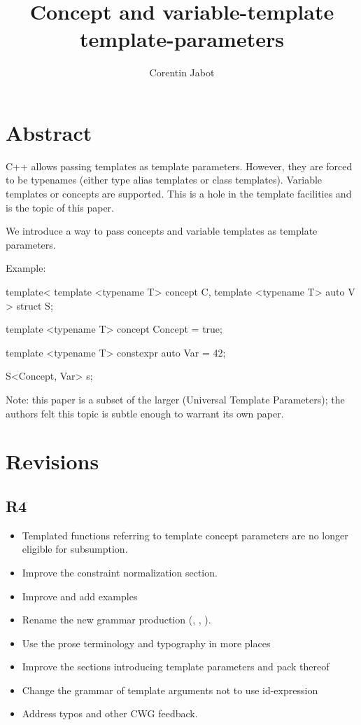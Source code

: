 \documentclass{wg21}
\title{Concept and variable-template template-parameters}
\author{Corentin Jabot}{corentin.jabot@gmail.com}
\begin{document}
\maketitle

\section{Abstract}

C++ allows passing templates as template parameters.
However, they are forced to be typenames (either type alias templates or class templates).
Variable templates or concepts are  supported.
This is a hole in the template facilities and is the topic of this paper.

We introduce a way to pass concepts and variable templates as template parameters.

Example:

\begin{colorblock}
template<
   template <typename T> concept C,
   template <typename T> auto V
>
struct S{};

template <typename T>
concept Concept = true;

template <typename T>
constexpr auto Var = 42;

S<Concept, Var> s;
\end{colorblock}

Note: this paper is a subset of the larger  (Universal Template Parameters); the authors felt this topic is subtle enough to warrant its own paper.

\section{Revisions}

\subsection{R4}

\begin{itemize}

\item Templated functions referring to template concept parameters are no
longer eligible for subsumption.
\item Improve the constraint normalization section.
\item Improve and add examples
\item Rename the new grammar production (,
, ).
\item Use the prose terminology and typography in more places
\item Improve the sections introducing template parameters and pack thereof
\item Change the grammar of template arguments not to use id-expression
\item Address typos and other CWG feedback.
\end{itemize}
\end{document}
